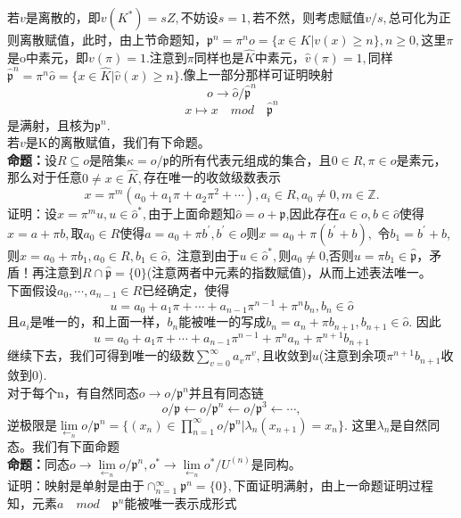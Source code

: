 \documentclass[UTF8]{article}
\begin{document}
    若$v$是离散的，即$v(K^{*})=sZ,$不妨设$s=1,$若不然，则考虑赋值$v/s,$总可化为正则离散赋值，此时，由上节命题知，$\mathfrak{p}^{n}=\pi ^{n}o=\{x\in K|v(x)\geq n\},n\geq 0,$这里$\pi $是o中素元，即$v(\pi )=1.$注意到$\pi$同样也是$\widehat{K}$中素元，$\widehat{v}(\pi )=1,$同样$\widehat{\mathfrak{p}}^{n}=\pi^{n}\widehat{o}=\{x\in \widehat{K}|\widehat{v}(x)\geq n\}.$像上一部分那样可证明映射$$
    o\rightarrow \widehat{o}/\widehat{\mathfrak{p}}^{n}
    $$
    $$
    x\mapsto x\quad mod\quad \widehat{\mathfrak{p}}^{n}
    $$
    是满射，且核为$\mathfrak{p}^{n}.$\\
    若$v$是K的离散赋值，我们有下命题。\\
    \textbf{命题：}设$R\subseteq o$是陪集$\kappa =o/\mathfrak{p}$的所有代表元组成的集合，且$0\in R,$$\pi\in o$是素元，那么对于任意$0\neq x\in \widehat{K},$存在唯一的收敛级数表示
    $$
    x=\pi^{m}(a_{0}+a_{1}\pi +a_{2}\pi^{2}+\cdots ),a_{i}\in R,a_{0}\neq 0,m\in \mathbb{Z}.
    $$
    证明：设$x=\pi^{m}u,u\in \widehat{o}^{*},$由于上面命题知$\widehat{o}=o+\widehat{\mathfrak{p}}$,因此存在$a\in o,b\in \widehat{o}$使得$x=a+\pi b,$取$a_{0}\in R$使得$a=a_{0}+\pi b^{'},b^{'}\in o$则$x=a_{0}+\pi(b^{'}+b),$
令$b_{1}=b^{'}+b$,则$x=a_{0}+\pi b_{1},a_{0}\in R,b_{1}\in \widehat{o},$  注意到由于$u\in \widehat{o}^{*},$则$a_{0}\neq 0 $,否则$u=\pi b_{1}\in \widehat{\mathfrak{p}}$，矛盾！再注意到$R\cap \widehat{\mathfrak{p}}=\{0\}$(注意两者中元素的指数赋值)，从而上述表法唯一。\\    
 下面假设$a_{0},\cdots,a_{n-1}\in R$已经确定，使得$$
 u=a_{0}+a_{1}\pi +\cdots +a_{n-1}\pi^{n-1}+\pi^{n}b_{n},b_{n}\in\widehat{o}
 $$
 且$a_{i}$是唯一的，和上面一样，$b_{n}$能被唯一的写成$b_{n}=a_{n}+\pi b_{n+1},b_{n+1}\in \widehat{o}.$
 因此$$
 u=a_{0}+a_{1}\pi +\cdots +a_{n-1}\pi^{n-1}+\pi^{n}a_{n}+\pi^{n+1}b_{n+1}
 $$
 继续下去，我们可得到唯一的级数$\sum_{v=0}^{\infty}a_{v}\pi^{v},$且收敛到$u$(注意到余项$\pi^{n+1}b_{n+1}$收敛到0).\\
 对于每个n，有自然同态$o\longrightarrow o/\mathfrak{p}^{n}$并且有同态链$$
 o/\mathfrak{p}\longleftarrow o/\mathfrak{p}^{n}\longleftarrow o/\mathfrak{p}^{3}\longleftarrow \cdots,
 $$
 逆极限是$\lim\limits_{\leftarrow_{n}}o/\mathfrak{p}^{n}=\{(x_{n})\in \prod_{n=1}^{\infty }o/\mathfrak{p}^{n}|\lambda_{n}(x_{n+1})=x_{n}\}.
 $
 这里$\lambda_{n}$是自然同态。我们有下面命题\\
 \textbf{命题：}同态$o\longrightarrow \lim\limits_{\leftarrow_{n}}o/\mathfrak{p}^{n},o^{*}\longrightarrow \lim\limits_{\leftarrow_{n}}o^{*}/U^{(n)}$是同构。\\
 证明：映射是单射是由于$\cap_{n=1}^{\infty}\mathfrak{p}^{n}=\{0\},$下面证明满射，由上一命题证明过程知，元素$a\quad mod \quad \mathfrak{p}^{n}$能被唯一表示成形式$$
\end{document}
